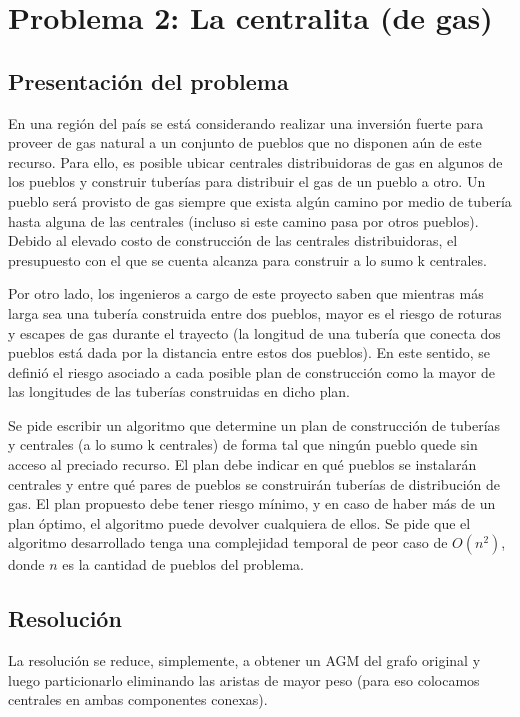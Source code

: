 \section{Problema 2: La centralita (de gas)}

\subsection{Presentaci\'on del problema}
En una regi\'on del pa\'is se est\'a considerando realizar una inversi\'on fuerte para proveer de gas natural
a un conjunto de pueblos que no disponen a\'un de este recurso. Para ello, es posible ubicar centrales
distribuidoras de gas en algunos de los pueblos y construir tuber\'ias para distribuir el gas de un pueblo a
otro. Un pueblo ser\'a provisto de gas siempre que exista alg\'un camino por medio de tuber\'ia hasta alguna
de las centrales (incluso si este camino pasa por otros pueblos). Debido al elevado costo de construcci\'on
de las centrales distribuidoras, el presupuesto con el que se cuenta alcanza para construir a lo sumo k
centrales.

Por otro lado, los ingenieros a cargo de este proyecto saben que mientras m\'as larga sea una tuber\'ia
construida entre dos pueblos, mayor es el riesgo de roturas y escapes de gas durante el trayecto (la
longitud de una tuber\'ia que conecta dos pueblos est\'a dada por la distancia entre estos dos pueblos).
En este sentido, se defini\'o el riesgo asociado a cada posible plan de construcci\'on como la mayor de las
longitudes de las tuber\'ias construidas en dicho plan.

Se pide escribir un algoritmo que determine un plan de construcci\'on de tuber\'ias y centrales (a lo sumo k
centrales) de forma tal que ning\'un pueblo quede sin acceso al preciado recurso. El plan debe indicar en
qu\'e pueblos se instalar\'an centrales y entre qu\'e pares de pueblos se construir\'an tuber\'ias de distribuci\'on de
gas. El plan propuesto debe tener riesgo m\'inimo, y en caso de haber m\'as de un plan \'optimo, el algoritmo
puede devolver cualquiera de ellos. Se pide que el algoritmo desarrollado tenga una complejidad temporal
de peor caso de $O(n^2)$, donde $n$ es la cantidad de pueblos del problema.

\subsection{Resoluci\'on}
La resolución se reduce, simplemente, a obtener un AGM del grafo original y luego particionarlo eliminando las aristas de mayor peso (para eso colocamos centrales en ambas componentes conexas).

